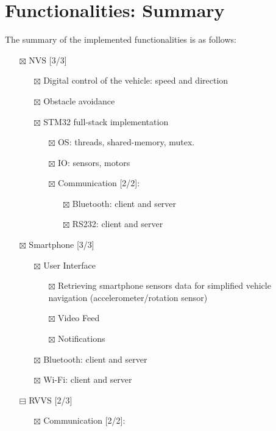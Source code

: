 \section{Functionalities: Summary}%
\label{sec:functionalities-summary}
% 
The summary of the implemented functionalities is as follows:
\begin{itemize}
\item[{$\boxtimes$}] NVS [3/3]
\begin{itemize}
\item[{$\boxtimes$}] Digital control of the vehicle: speed and direction
\item[{$\boxtimes$}] Obstacle avoidance
\item[{$\boxtimes$}] STM32 full-stack implementation
\begin{itemize}
\item[{$\boxtimes$}] OS: threads, shared-memory, mutex.
\item[{$\boxtimes$}] IO: sensors, motors
\item[{$\boxtimes$}] Communication [2/2]:
\begin{itemize}
\item[{$\boxtimes$}] Bluetooth: client and server
\item[{$\boxtimes$}] RS232: client and server
\end{itemize}
\end{itemize}
\end{itemize}
\item[{$\boxtimes$}] Smartphone [3/3]
\begin{itemize}
\item[{$\boxtimes$}] User Interface
\begin{itemize}
\item[{$\boxtimes$}] Retrieving smartphone sensors data for simplified vehicle
navigation (accelerometer/rotation sensor)
\item[{$\boxtimes$}] Video Feed
\item[{$\boxtimes$}] Notifications
\end{itemize}
\item[{$\boxtimes$}] Bluetooth: client and server
\item[{$\boxtimes$}] Wi-Fi: client and server
\end{itemize}
\item[{$\boxminus$}] RVVS [2/3]
\begin{itemize}
\item[{$\boxtimes$}] Communication [2/2]:
\begin{itemize}

\end{itemize}
\end{itemize}
\end{itemize}
